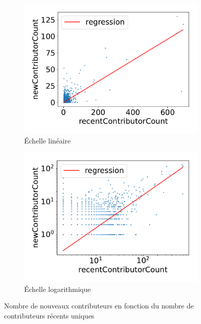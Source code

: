 \documentclass[dvipsnames,runningheads]{llncs}
\begin{document}
    \begin{figure}
        \centering
        \begin{subfigure}[t]{0.5\textwidth}
            \includegraphics[width=\textwidth]{../experiment/data_analysis/recentContributorCountRegression_linearScale}
            \caption{Échelle linéaire}
        \end{subfigure}%
        \begin{subfigure}[t]{0.5\textwidth}
            \includegraphics[width=\textwidth]{../experiment/data_analysis/recentContributorCountRegression_logScale}
            \caption{Échelle logarithmique}
        \end{subfigure}

        \caption{Nombre de nouveaux contributeurs en fonction du nombre de contributeurs récents uniques}
        \label{fig:contributorCount}
    \end{figure}
\end{document}
